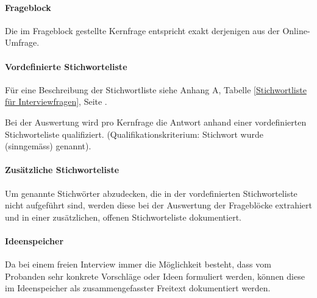 \documentclass[../../main.tex]{subfiles}
\begin{document}
\paragraph*{Frageblock}\mbox{}

\begin{sloppypar}
Die im Frageblock gestellte Kernfrage entspricht exakt derjenigen aus der Online-Umfrage.
\end{sloppypar}

\paragraph*{Vordefinierte Stichworteliste}\mbox{}

\begin{sloppypar}
Für eine Beschreibung der Stichwortliste  siehe Anhang A, Tabelle \ref{Stichwortliste für Interviewfragen}, Seite \pageref{Stichwortliste für Interviewfragen}.

Bei der Auswertung wird pro Kernfrage die Antwort anhand einer vordefinierten Stichworteliste qualifiziert. (Qualifikationskriterium: Stichwort wurde (sinngemäss) genannt).
\end{sloppypar}

\paragraph*{Zusätzliche Stichworteliste}\mbox{}

\begin{sloppypar}
Um genannte Stichwörter abzudecken, die in der vordefinierten Stichworteliste nicht aufgeführt sind, werden diese bei der Auswertung der Frageblöcke extrahiert und in einer zusätzlichen, offenen Stichworteliste dokumentiert.
\end{sloppypar}

\paragraph*{Ideenspeicher}\mbox{}

\begin{sloppypar}
Da bei einem freien Interview immer die Möglichkeit besteht, dass vom Probanden sehr konkrete Vorschläge oder Ideen formuliert werden, können diese im Ideenspeicher als zusammengefasster Freitext dokumentiert werden.
\end{sloppypar}
\end{document}
